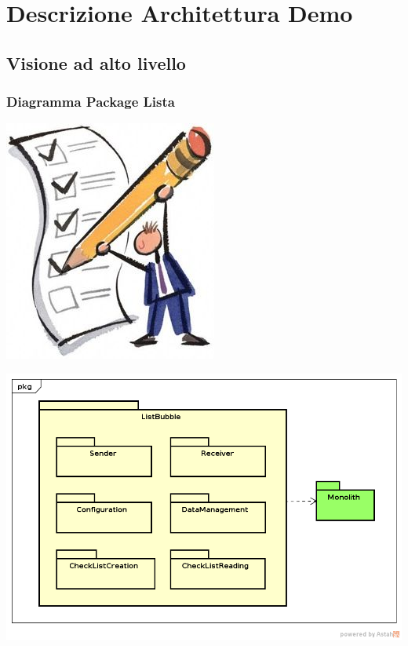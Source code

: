 \section{Descrizione Architettura Demo}
\subsection{Visione ad alto livello}
\begin{frame}
	\frametitle{Diagramma Package Lista}
	\begin{center}
		\includegraphics[scale=0.15]{img/lista_img.jpg}
	\end{center}
	\begin{center}
		\includegraphics[scale=0.35]{img/listchecklistTop.png}
	\end{center}
\end{frame}

